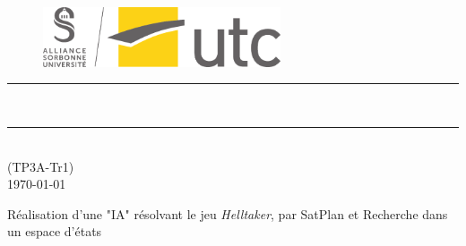 \thispagestyle{empty} %
\setcounter{page}{0} %

\begin{figure}[H]
\centering
\includegraphics[width=7cm]{./Graphismes-UTC/logos/UTC/logo_UTC.pdf}
\end{figure}

\vspace{3cm}

\begin{center}

{\color{jauneUTC}\rule{\linewidth}{0.8mm}}
\vspace*{0mm}

\Huge{\textbf{\theUV \\ \thetitle}}
{\color{jauneUTC}\rule{\linewidth}{0.8mm}}

\vspace{0.5cm}
\Large{\theauthor} \\
\small{(TP3A-Tr1)}\\
\Large{\today}
\end{center}
 
\vspace{3cm}

\begin{myabstract}
Réalisation d'une "IA" résolvant le jeu \textit{Helltaker}, par SatPlan et Recherche dans un espace d'états
\end{myabstract}

\clearpage
